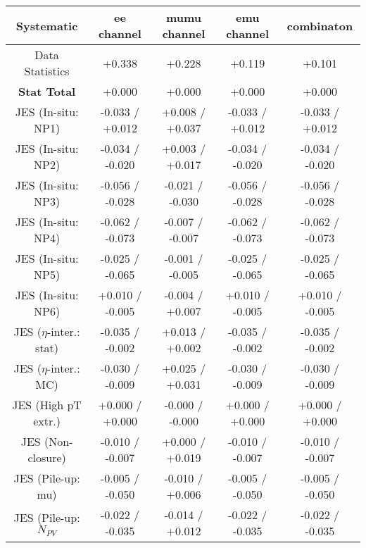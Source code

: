 \begin{table}[htbp]
\scriptsize
  \begin{center} 
  \begin{tabular}{|c|c|c|c|c|}
  \hline
Systematic                            &  ee channel&  mumu channel&  emu channel&  combinaton\\
  \hline
Data Statistics                       &+0.338              & +0.228              & +0.119              & +0.101             \\
\hline
\textbf{Stat Total}                   &+0.000              & +0.000              & +0.000              & +0.000             \\
\hline
JES (In-situ: NP1)                    &-0.033   / +0.012   & +0.008   / +0.037   & -0.033   / +0.012   & -0.033   / +0.012  \\
JES (In-situ: NP2)                    &-0.034   / -0.020   & +0.003   / +0.017   & -0.034   / -0.020   & -0.034   / -0.020  \\
JES (In-situ: NP3)                    &-0.056   / -0.028   & -0.021   / -0.030   & -0.056   / -0.028   & -0.056   / -0.028  \\
JES (In-situ: NP4)                    &-0.062   / -0.073   & -0.007   / -0.007   & -0.062   / -0.073   & -0.062   / -0.073  \\
JES (In-situ: NP5)                    &-0.025   / -0.065   & -0.001   / -0.005   & -0.025   / -0.065   & -0.025   / -0.065  \\
JES (In-situ: NP6)                    &+0.010   / -0.005   & -0.004   / +0.007   & +0.010   / -0.005   & +0.010   / -0.005  \\
JES ($\eta$-inter.: stat)               &-0.035   / -0.002   & +0.013   / +0.002   & -0.035   / -0.002   & -0.035   / -0.002  \\
JES ($\eta$-inter.: MC)                 &-0.030   / -0.009   & +0.025   / +0.031   & -0.030   / -0.009   & -0.030   / -0.009  \\
JES (High pT extr.)                  &+0.000   / +0.000   & -0.000   / -0.000   & +0.000   / +0.000   & +0.000   / +0.000  \\
JES (Non-closure)                     &-0.010   / -0.007   & +0.000   / +0.019   & -0.010   / -0.007   & -0.010   / -0.007  \\
JES (Pile-up: mu)                     &-0.005   / -0.050   & -0.010   / +0.006   & -0.005   / -0.050   & -0.005   / -0.050  \\
JES (Pile-up: $N_{PV}$                  &-0.022   / -0.035   & -0.014   / +0.012   & -0.022   / -0.035   & -0.022   / -0.035  \\

\end{tabular}
\end{center}
\end{table}
